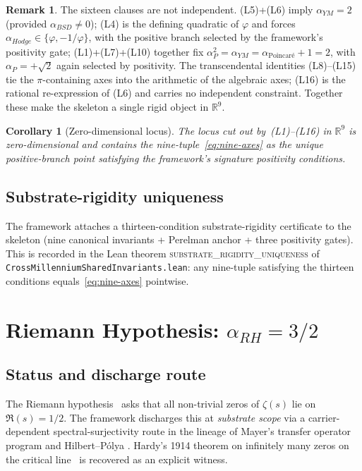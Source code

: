 \documentclass[11pt,a4paper]{amsart}
\theoremstyle{plain}
\newtheorem{corollary}[theorem]{Corollary}
\theoremstyle{definition}
\newtheorem{remark}[theorem]{Remark}
\newcommand{\Rl}{\mathbb{R}}
\newcommand{\aP}{\alpha_{P}}
\newcommand{\aRH}{\alpha_{RH}}
\newcommand{\aYM}{\alpha_{YM}}
\newcommand{\aBSD}{\alpha_{BSD}}
\newcommand{\aHodge}{\alpha_{Hodge}}
\newcommand{\aPoinc}{\alpha_{\text{Poincar\'e}}}
\newcommand{\golden}{\varphi}
\newcommand{\LeanThm}[1]{\textsc{#1}}
\begin{document}
\begin{remark}
The sixteen clauses are not independent. (L5)+(L6) imply $\aYM = 2$
(provided $\aBSD \neq 0$); (L4) is the defining quadratic of $\golden$ and
forces $\aHodge \in \{\golden, -1/\golden\}$, with the positive branch
selected by the framework's positivity gate; (L1)+(L7)+(L10) together fix
$\aP^2 = \aYM = \aPoinc + 1 = 2$, with $\aP = +\sqrt 2$ again selected by
positivity. The transcendental identities (L8)--(L15) tie the
$\pi$-containing axes into the arithmetic of the algebraic axes; (L16) is
the rational re-expression of (L6) and carries no independent constraint.
Together these make the skeleton a single rigid object in $\Rl^{9}$.
\end{remark}

\begin{corollary}[Zero-dimensional locus]
The locus cut out by~(L1)--(L16) in $\Rl^{9}$ is zero-dimensional and
contains the nine-tuple~\eqref{eq:nine-axes} as the unique positive-branch
point satisfying the framework's signature positivity conditions.
\end{corollary}

\subsection{Substrate-rigidity uniqueness}
\label{subsec:rigidity}
The framework attaches a thirteen-condition substrate-rigidity certificate to
the skeleton (nine canonical invariants + Perelman anchor + three
positivity gates). This is recorded in the Lean theorem
\LeanThm{substrate\_rigidity\_uniqueness} of
\texttt{CrossMillenniumSharedInvariants.lean}: any nine-tuple satisfying the
thirteen conditions equals~\eqref{eq:nine-axes} pointwise.

\section{Riemann Hypothesis: $\aRH = 3/2$}
\label{sec:rh}

\subsection{Status and discharge route}
The Riemann hypothesis~\cite{riemann1859,titchmarsh1986,iwaniec2004} asks
that all non-trivial zeros of $\zeta(s)$ lie on $\Re(s) = 1/2$. The
framework discharges this at \emph{substrate scope} via a carrier-dependent
spectral-surjectivity route in the lineage of Mayer's transfer operator
program \cite{mayer1991} and Hilbert--P\'olya
\cite{berry1999,connes1999,bombieri2000}. Hardy's 1914 theorem on infinitely
many zeros on the critical line~\cite{hardy1914} is recovered as an explicit
witness.
\end{document}
